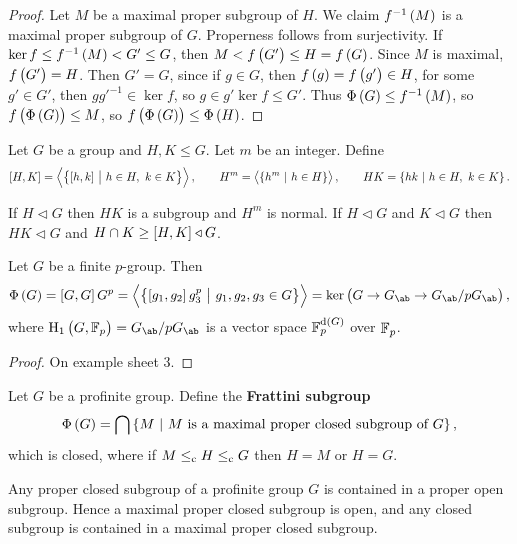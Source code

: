 \begin{proof}
Let $ M $ be a maximal proper subgroup of $ H $. We claim $ f^{-1}\br{M} $ is a maximal proper subgroup of $ G $. Properness follows from surjectivity. If $ \ker f \le f^{-1}\br{M} < G' \le G $, then $ M < f\br{G'} \le H = f\br{G} $. Since $ M $ is maximal, $ f\br{G'} = H $. Then $ G' = G $, since if $ g \in G $, then $ f\br{g} = f\br{g'} \in H $, for some $ g' \in G' $, then $ gg'^{-1} \in \ker f $, so $ g \in g'\ker f \le G' $. Thus $ \Phi\br{G} \le f^{-1}\br{M} $, so $ f\br{\Phi\br{G}} \le M $, so $ f\br{\Phi\br{G}} \le \Phi\br{H} $.
\end{proof}

\begin{definition}
Let $ G $ be a group and $ H, K \le G $. Let $ m $ be an integer. Define
$$ \sbr{H, K} = \abr{\cbr{\sbr{h, k} \st h \in H, \ k \in K}}, \qquad H^m = \abr{\cbr{h^m \st h \in H}}, \qquad HK = \cbr{hk \st h \in H, \ k \in K}. $$
\end{definition}

If $ H \triangleleft G $ then $ HK $ is a subgroup and $ H^m $ is normal. If $ H \triangleleft G $ and $ K \triangleleft G $ then $ HK \triangleleft G $ and $ H \cap K \ge \sbr{H, K} \triangleleft G $.

\begin{proposition}
Let $ G $ be a finite $ p $-group. Then
$$ \Phi\br{G} = \sbr{G, G}G^p = \abr{\cbr{\sbr{g_1, g_2}g_3^p \st g_1, g_2, g_3 \in G}} = \ker \br{G \to G_{\ab} \to G_{\ab} / pG_{\ab}}, $$
where $ \H_1\br{G, \FF_p} = G_{\ab} / pG_{\ab} $ is a vector space $ \FF_p^{\d\br{G}} $ over $ \mathbb{F}_p $.
\end{proposition}

\begin{proof}
On example sheet $ 3 $.
\end{proof}

\pagebreak

\begin{definition}
Let $ G $ be a profinite group. Define the \textbf{Frattini subgroup}
$$ \Phi\br{G} = \bigcap \cbr{M \st M \ \text{is a maximal proper closed subgroup of} \ G}, $$
which is closed, where if $ M \le_{\mathrm{c}} H \le_{\mathrm{c}} G $ then $ H = M $ or $ H = G $.
\end{definition}

\begin{proposition}
Any proper closed subgroup of a profinite group $ G $ is contained in a proper open subgroup. Hence a maximal proper closed subgroup is open, and any closed subgroup is contained in a maximal proper closed subgroup.
\end{proposition}


